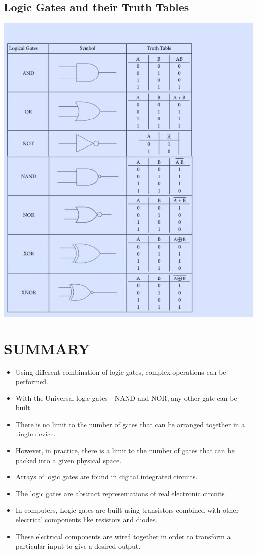 \documentclass{article}
\begin{document}
\subsection{Logic Gates and their Truth Tables}
\includegraphics{23}

\section{SUMMARY}
\begin{itemize}
	\item Using different combination of logic gates, complex operations can be performed. 
	\item With the Universal logic gates - NAND and NOR, any other gate can be built
	\item There is no limit to the number of gates that can be arranged together in a single device. 
	\item However, in practice, there is a limit to the number of gates that can be packed into a given physical space. 
	\item Arrays of logic gates are found in digital integrated circuits.
	\item The logic gates are abstract representations of real electronic circuits
	\item In computers, Logic gates are built using transistors combined with other electrical components like resistors and diodes. 
	\item These electrical components are wired together in order to transform a particular input to give a desired output. \cite{108}
\end{itemize}
\end{document}
